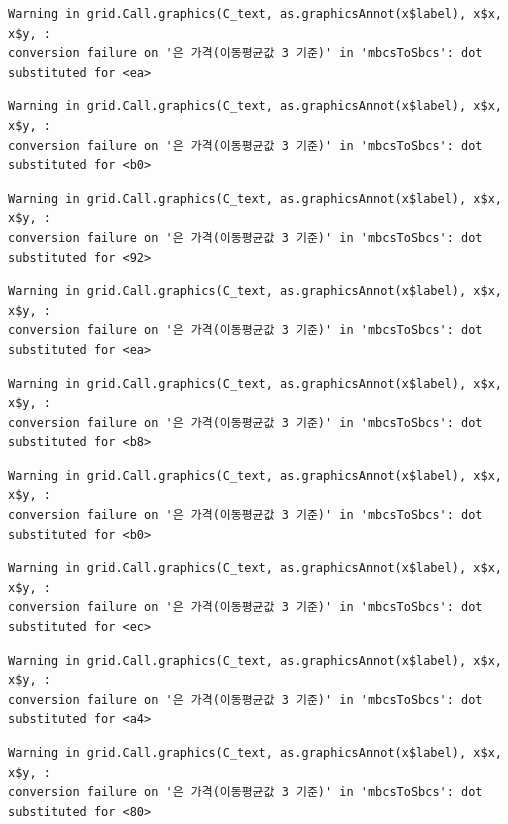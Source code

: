 \documentclass[
  letterpaper,
  DIV=11,
  numbers=noendperiod]{scrreprt}
\begin{document}
\begin{verbatim}
Warning in grid.Call.graphics(C_text, as.graphicsAnnot(x$label), x$x, x$y, :
conversion failure on '은 가격(이동평균값 3 기준)' in 'mbcsToSbcs': dot
substituted for <ea>
\end{verbatim}

\begin{verbatim}
Warning in grid.Call.graphics(C_text, as.graphicsAnnot(x$label), x$x, x$y, :
conversion failure on '은 가격(이동평균값 3 기준)' in 'mbcsToSbcs': dot
substituted for <b0>
\end{verbatim}

\begin{verbatim}
Warning in grid.Call.graphics(C_text, as.graphicsAnnot(x$label), x$x, x$y, :
conversion failure on '은 가격(이동평균값 3 기준)' in 'mbcsToSbcs': dot
substituted for <92>
\end{verbatim}

\begin{verbatim}
Warning in grid.Call.graphics(C_text, as.graphicsAnnot(x$label), x$x, x$y, :
conversion failure on '은 가격(이동평균값 3 기준)' in 'mbcsToSbcs': dot
substituted for <ea>
\end{verbatim}

\begin{verbatim}
Warning in grid.Call.graphics(C_text, as.graphicsAnnot(x$label), x$x, x$y, :
conversion failure on '은 가격(이동평균값 3 기준)' in 'mbcsToSbcs': dot
substituted for <b8>
\end{verbatim}

\begin{verbatim}
Warning in grid.Call.graphics(C_text, as.graphicsAnnot(x$label), x$x, x$y, :
conversion failure on '은 가격(이동평균값 3 기준)' in 'mbcsToSbcs': dot
substituted for <b0>
\end{verbatim}

\begin{verbatim}
Warning in grid.Call.graphics(C_text, as.graphicsAnnot(x$label), x$x, x$y, :
conversion failure on '은 가격(이동평균값 3 기준)' in 'mbcsToSbcs': dot
substituted for <ec>
\end{verbatim}

\begin{verbatim}
Warning in grid.Call.graphics(C_text, as.graphicsAnnot(x$label), x$x, x$y, :
conversion failure on '은 가격(이동평균값 3 기준)' in 'mbcsToSbcs': dot
substituted for <a4>
\end{verbatim}

\begin{verbatim}
Warning in grid.Call.graphics(C_text, as.graphicsAnnot(x$label), x$x, x$y, :
conversion failure on '은 가격(이동평균값 3 기준)' in 'mbcsToSbcs': dot
substituted for <80>
\end{verbatim}
\end{document}

